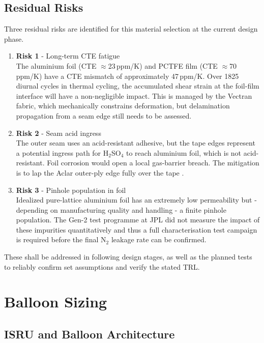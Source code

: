 \subsection{Residual Risks}
\label{ssec:mat-risks}

Three residual risks are identified for this material selection at the current design phase.

\begin{enumerate}
    \item \textbf{Risk 1} - Long-term CTE fatigue \\The aluminium foil (CTE $\approx$23\,ppm/K) and PCTFE film (CTE $\approx$70\,ppm/K) have a CTE mismatch of approximately 47\,ppm/K. Over 1825 diurnal cycles in thermal cycling, the accumulated shear strain at the foil-film interface will have a non-negligible impact. This is managed by the Vectran fabric, which mechanically constrains deformation, but delamination propagation from a seam edge still needs to be assessed. 
    \item \textbf{Risk 2} - Seam acid ingress \\The outer seam uses an acid-resistant adhesive, but the tape edges represent a potential ingress path for H$_2$SO$_4$ to reach aluminium foil, which is not acid-resistant. Foil corrosion would open a local gas-barrier breach. The mitigation is to lap the Aclar outer-ply edge fully over the tape \cite{Hall2011_TechDev}.
    \item \textbf{Risk 3} - Pinhole population in foil\\ Idealized pure-lattice aluminium foil has an extremely low permeability but - depending on manufacturing quality and handling - a finite pinhole population. The Gen-2 test programme at JPL did not measure the impact of these impurities quantitatively and thus a full characterisation test campaign is required before the final N$_2$ leakage rate can be confirmed.
\end{enumerate}

\noindent These shall be addressed in following design stages, as well as the planned tests to reliably confirm set assumptions and verify the stated TRL.


\section{Balloon Sizing}

\subsection*{ISRU and Balloon Architecture}

